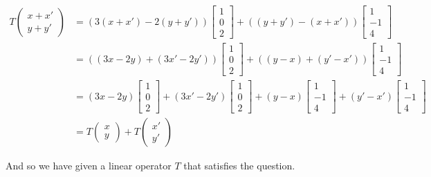 \documentclass{article}
\begin{document}
\begin{align*}
  T\begin{pmatrix}
    x+x'\\y+y'
  \end{pmatrix}&=(3(x+x')-2(y+y'))\begin{bmatrix}
    1\\0\\2
  \end{bmatrix}+((y+y')-(x+x'))\begin{bmatrix}
    1\\-1\\4
  \end{bmatrix}\\
  &=((3x-2y)+(3x'-2y'))\begin{bmatrix}
    1\\0\\2
  \end{bmatrix}+((y-x)+(y'-x'))\begin{bmatrix}
    1\\-1\\4
  \end{bmatrix}\\
  &=(3x-2y)\begin{bmatrix}
    1\\0\\2
  \end{bmatrix}+(3x'-2y')\begin{bmatrix}
    1\\0\\2
  \end{bmatrix}+(y-x)\begin{bmatrix}
    1\\-1\\4
  \end{bmatrix}+(y'-x')\begin{bmatrix}
    1\\-1\\4
  \end{bmatrix}\\
  &=T\begin{pmatrix}
    x\\y
  \end{pmatrix}+T\begin{pmatrix}
    x'\\y'
  \end{pmatrix}
\end{align*}

And so we have given a linear operator $T$ that satisfies the question.
\end{document}
